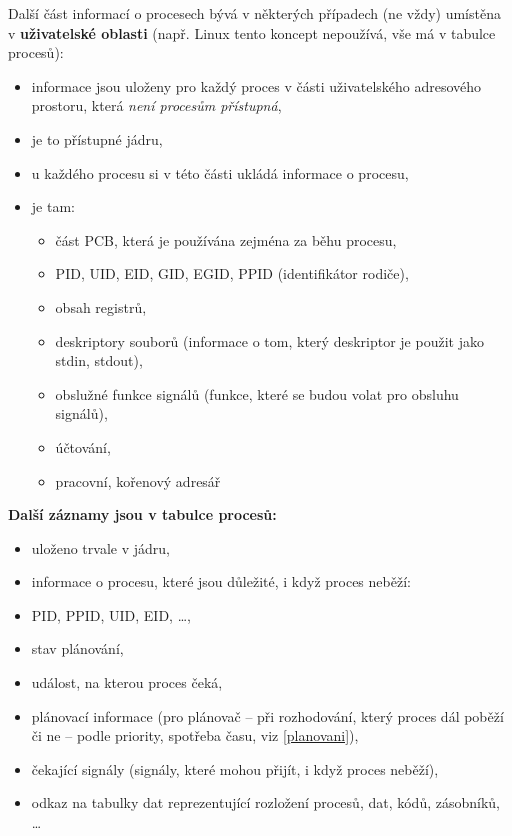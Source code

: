 \documentclass[a4paper, 11pt]{article}
\begin{document}
Další část informací o procesech bývá v některých případech (ne vždy) umístěna v \textbf{uživatelské oblasti} (např. Linux tento koncept nepoužívá, vše má v tabulce procesů):
\begin{itemize}
    \item informace jsou uloženy pro každý proces v části uživatelského adresového prostoru, která \textit{není procesům přístupná},
    \item je to přístupné jádru,
    \item u každého procesu si v této části ukládá informace o procesu,
    \item je tam:
    \begin{itemize}
    \item část PCB, která je používána zejména za běhu procesu,
    \item PID, UID, EID, GID, EGID, PPID (identifikátor rodiče),
    \item obsah registrů,
    \item deskriptory souborů (informace o tom, který deskriptor je použit jako stdin, stdout),
    \item obslužné funkce signálů (funkce, které se budou volat pro obsluhu signálů),
    \item účtování,
    \item pracovní, kořenový adresář
    \end{itemize}
\end{itemize}
 
\textbf{Další záznamy jsou v tabulce procesů:}
\begin{itemize}
    \item uloženo trvale v jádru,
    \item informace o procesu, které jsou důležité, i když proces neběží:
    \item PID, PPID, UID, EID, \ldots,
    \item stav plánování,
    \item událost, na kterou proces čeká,
    \item plánovací informace (pro plánovač -- při rozhodování, který proces dál poběží či ne -- podle priority, spotřeba času, viz \ref{planovani}),
    \item čekající signály (signály, které mohou přijít, i když proces neběží),
    \item odkaz na tabulky dat reprezentující rozložení procesů, dat, kódů, zásobníků, \ldots
\end{itemize}
 
\newpage
 
\end{document}
